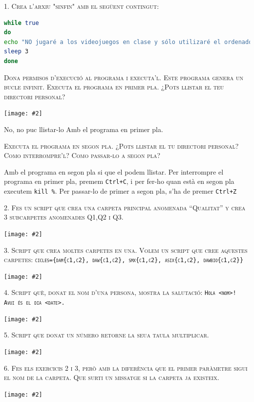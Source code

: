 \documentclass[a4paper,12pt]{article}
\newcommand{\mygraphic}[2][width=\textwidth]{\begin{center}
		\centering\texttt{[image: \#2]}\par
\end{center}}
\begin{document}


\newpage
\textsc{1. Crea l'arxiu "sinfin" amb el següent contingut:}
\begin{lstlisting}[language=bash]
while true
do
echo "NO jugaré a los videojuegos en clase y sólo utilizaré el ordenador con fines académicos"
sleep 3
done
\end{lstlisting}

\textsc{Dona permisos d'execució al programa i executa'l. Este programa genera un bucle infinit.
Executa el programa en primer pla. ¿Pots llistar el teu directori personal?}

\mygraphic{imatges/1.png}
No, no puc llistar-lo Amb el programa en primer pla.

\textsc{Executa el programa en segon pla. ¿Pots llistar el tu directori personal? Como interrompre'l? Como passar-lo a segon pla? }

Amb el programa en segon pla si que el podem llistar. Per interrompre el programa en primer pla, premem \texttt{Ctrl+C}, i per fer-ho quan està en segon pla executem \texttt{kill \%}. Per passar-lo de primer a segon pla, s'ha de premer \texttt{Ctrl+Z}

\newpage
\textsc{2. Fes un script que crea una carpeta principal anomenada “Qualitat” y crea 3 subcarpetes anomenades Q1,Q2 i Q3.}

\mygraphic{imatges/2.png}

\newpage
\textsc{3. Script que crea moltes carpetes en una. Volem un script que cree aquestes carpetes:
\texttt{cicles=\{dam\{c1,c2\}, daw\{c1,c2\}, smx\{c1,c2\}, asix\{c1,c2\}, dawbio\{c1,c2\}\}}}

\mygraphic{imatges/3.png}

\newpage
\textsc{4. Script què, donat el nom d’una persona, mostra la salutació: \linebreak
\texttt{Hola <nom>! \linebreak
Avui és el dia <date>.}}

\mygraphic{imatges/4.png}

\newpage
\textsc{5. Script que donat un número retorne la seua taula multiplicar.}

\mygraphic{imatges/5.png}

\newpage
\textsc{6. Fes els exercicis 2 i 3, però amb la diferència que el primer paràmetre sigui el nom de la carpeta. Que surti un missatge si la carpeta ja existeix.}


\mygraphic{imatges/6.png}
\end{document}
